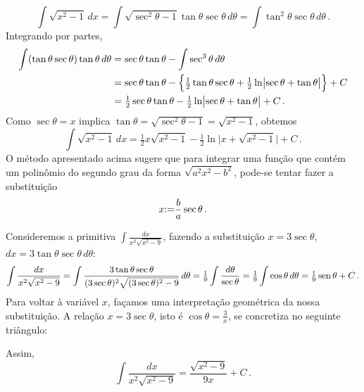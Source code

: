 $$\int
\sqrt{x^2-1}\,dx=\int\sqrt{\sec^2\theta-1}\tan\theta\sec\theta\,d\theta
=\int \tan^2\theta\sec\theta\,d\theta\,.$$
Integrando por partes,
\begin{align*}
\int
(\tan\theta\sec\theta)\tan\theta\,
d\theta&=\sec\theta\tan\theta-\int\sec^3\theta\, d\theta\\
&=\sec\theta\tan\theta-\Bigl\{
\tfrac12\tan\theta\sec\theta+\tfrac12\ln\bigl|\sec\theta+\tan
\theta\bigr|
\Bigr\}+C\\
&=\tfrac12\sec\theta\tan\theta-\tfrac12\ln\bigl|\sec\theta+\tan
\theta\bigr|+C\,.
\end{align*}
Como $\sec\theta=x$ implica
$\tan\theta=\sqrt{\sec^2\theta-1}=\sqrt{x^2-1}$, obtemos
$$\boxed{
\int\sqrt{x^2-1}\,dx=\tfrac12
x\sqrt{x^2-1}-\tfrac12 \ln\bigl|x+\sqrt{x^2-1}\bigr|+C\,.}
$$
O método apresentado acima sugere que para integrar uma função que contém um
polinômio do segundo grau da forma $\sqrt{a^2x^2-b^2}$, pode-se tentar fazer a
substituição $$x{:=} \frac{b}{a}\sec \theta\,.$$

\begin{ex}
Consideremos a primitiva $\int\frac{dx}{x^2\sqrt{x^2-9}}$, fazendo a
substituição $x=3\sec\theta$, $dx=3\tan\theta\sec\theta\,d\theta$:
$$
\int\frac{dx}{x^2\sqrt{x^2-9}}=\int\frac{3\tan\theta\sec\theta}{(3\sec\theta)^2
\sqrt{(3\sec\theta)^2-9}}\,d\theta
=\tfrac{1}{9}\int\frac{d\theta}{\sec\theta}=
\tfrac19\int\cos\theta\,d\theta
=\tfrac19\operatorname{sen}\theta+C\,.
$$
Para voltar à variável $x$, façamos uma interpretação geométrica da nossa
substituição. A relação $x=3\sec\theta$, isto é $\cos\theta =\frac{3}{x}$, se
concretiza no seguinte triângulo:
\begin{center}
\begin{bmlimage}\end{bmlimage}
\end{center}
Assim, 
$$
\int\frac{dx}{x^2\sqrt{x^2-9}}=\frac{\sqrt{x^2-9}}{9x}+C\,.
$$
\end{ex}

